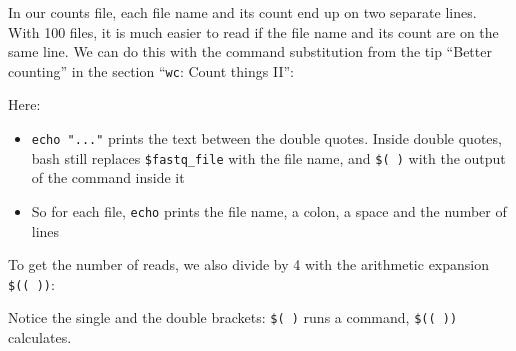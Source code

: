 \documentclass[
  letterpaper,
  DIV=11,
  numbers=noendperiod]{scrreprt}
\newenvironment{Shaded}{}{}
\newcommand{\AttributeTok}[1]{\textcolor[rgb]{0.84,0.23,0.29}{#1}}
\newcommand{\BuiltInTok}[1]{\textcolor[rgb]{0.84,0.23,0.29}{#1}}
\newcommand{\ControlFlowTok}[1]{\textcolor[rgb]{0.84,0.23,0.29}{#1}}
\newcommand{\DecValTok}[1]{\textcolor[rgb]{0.00,0.36,0.77}{#1}}
\newcommand{\FunctionTok}[1]{\textcolor[rgb]{0.44,0.26,0.76}{#1}}
\newcommand{\KeywordTok}[1]{\textcolor[rgb]{0.84,0.23,0.29}{#1}}
\newcommand{\NormalTok}[1]{\textcolor[rgb]{0.14,0.16,0.18}{#1}}
\newcommand{\OperatorTok}[1]{\textcolor[rgb]{0.14,0.16,0.18}{#1}}
\newcommand{\PreprocessorTok}[1]{\textcolor[rgb]{0.84,0.23,0.29}{#1}}
\newcommand{\StringTok}[1]{\textcolor[rgb]{0.01,0.18,0.38}{#1}}
\newcommand{\VariableTok}[1]{\textcolor[rgb]{0.89,0.38,0.04}{#1}}
\providecommand{\tightlist}{%
  \setlength{\itemsep}{0pt}\setlength{\parskip}{0pt}}
\begin{document}
\begin{tcolorbox}[enhanced jigsaw, coltitle=black, breakable, titlerule=0mm, colback=white, rightrule=.15mm, bottomrule=.15mm, toprule=.15mm, colframe=quarto-callout-tip-color-frame, colbacktitle=quarto-callout-tip-color!10!white, bottomtitle=1mm, opacitybacktitle=0.6, toptitle=1mm, leftrule=.75mm, arc=.35mm, title=\textcolor{quarto-callout-tip-color}{\faLightbulb}\hspace{0.5em}{Tip: Better counting in for loops (optional)}, left=2mm, opacityback=0]

In our counts file, each file name and its count end up on two separate
lines. With 100 files, it is much easier to read if the file name and
its count are on the same line. We can do this with the command
substitution from the tip ``Better counting'' in the section
``\texttt{wc}: Count things II'':

\begin{Shaded}
\end{Shaded}

Here:

\begin{itemize}
\tightlist
\item
  \texttt{echo\ "..."} prints the text between the double quotes. Inside
  double quotes, bash still replaces \texttt{\$fastq\_file} with the
  file name, and \texttt{\$(\ )} with the output of the command inside
  it
\item
  So for each file, \texttt{echo} prints the file name, a colon, a space
  and the number of lines
\end{itemize}

To get the number of reads, we also divide by 4 with the arithmetic
expansion \texttt{\$((\ ))}:

\begin{Shaded}
\end{Shaded}

Notice the single and the double brackets: \texttt{\$(\ )} runs a
command, \texttt{\$((\ ))} calculates.

\end{tcolorbox}
\end{document}
